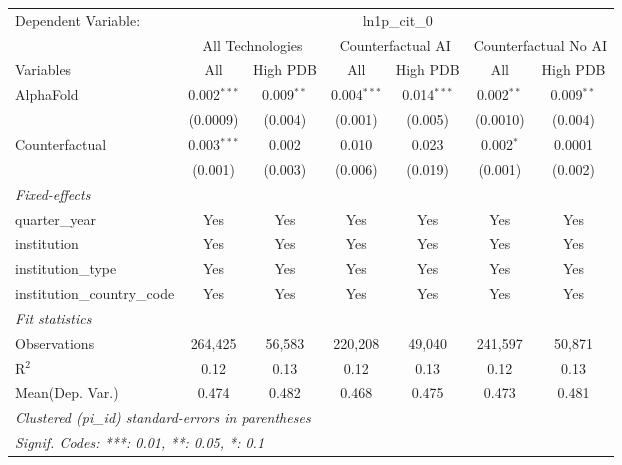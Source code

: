 \begingroup
\centering
\begin{tabular}{lcccccc}
   \tabularnewline \midrule \midrule
   Dependent Variable: & \multicolumn{6}{c}{ln1p\_cit\_0}\\
 & \multicolumn{2}{c}{All Technologies} & \multicolumn{2}{c}{Counterfactual AI} & \multicolumn{2}{c}{Counterfactual No AI} \\
\cmidrule(lr){1-1}\cmidrule(lr){2-3} \cmidrule(lr){4-5} \cmidrule(lr){6-7}
Variables & \multicolumn{1}{c}{All} & \multicolumn{1}{c}{High PDB} & \multicolumn{1}{c}{All} & \multicolumn{1}{c}{High PDB} & \multicolumn{1}{c}{All} & \multicolumn{1}{c}{High PDB} \\
\cmidrule(lr){1-1}\cmidrule(lr){2-2} \cmidrule(lr){3-3} \cmidrule(lr){4-4} \cmidrule(lr){5-5} \cmidrule(lr){6-6} \cmidrule(lr){7-7}
   AlphaFold                    & 0.002$^{***}$ & 0.009$^{**}$ & 0.004$^{***}$ & 0.014$^{***}$ & 0.002$^{**}$ & 0.009$^{**}$\\   
                                & (0.0009)      & (0.004)      & (0.001)       & (0.005)       & (0.0010)     & (0.004)\\   
   Counterfactual               & 0.003$^{***}$ & 0.002        & 0.010         & 0.023         & 0.002$^{*}$  & 0.0001\\   
                                & (0.001)       & (0.003)      & (0.006)       & (0.019)       & (0.001)      & (0.002)\\   
   \midrule
   \emph{Fixed-effects}\\
   quarter\_year                & Yes           & Yes          & Yes           & Yes           & Yes          & Yes\\  
   institution                  & Yes           & Yes          & Yes           & Yes           & Yes          & Yes\\  
   institution\_type            & Yes           & Yes          & Yes           & Yes           & Yes          & Yes\\  
   institution\_country\_code   & Yes           & Yes          & Yes           & Yes           & Yes          & Yes\\  
   \midrule
   \emph{Fit statistics}\\
   Observations                 & 264,425       & 56,583       & 220,208       & 49,040        & 241,597      & 50,871\\  
   R$^2$                        & 0.12          & 0.13         & 0.12          & 0.13          & 0.12         & 0.13\\  
Mean(Dep. Var.) & 0.474 & 0.482 & 0.468 & 0.475 & 0.473 & 0.481 \\
   \midrule \midrule
   \multicolumn{7}{l}{\emph{Clustered (pi\_id) standard-errors in parentheses}}\\
   \multicolumn{7}{l}{\emph{Signif. Codes: ***: 0.01, **: 0.05, *: 0.1}}\\
\end{tabular}
\par\endgroup
